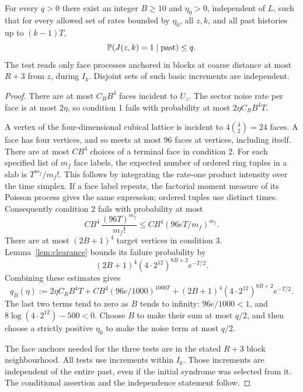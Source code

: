 \begin{lemma}\label{lem:bad-prob}
For every \(q>0\) there exist an integer \(B\ge10\) and
\(\eta_0>0\), independent of \(L\), such that for every allowed set of
rates bounded by \(\eta_0\), all \(z,k\), and all past histories up to
\((k-1)T\),
\[
 \mathbb P(J(z,k)=1\mid\text{past})\le q.
\]
The test reads only face processes anchored in blocks at coarse
distance at most \(R+3\) from \(z\), during \(I_k\).
Disjoint sets of such basic increments are independent.
\end{lemma}
\begin{proof}
There are at most \(C_RB^4\) faces incident to \(U_z\). The sector
noise rate per face is at most \(2\eta\), so condition 1 fails with
probability at most \(2\eta C_RB^4T\).

A vertex of the four-dimensional cubical lattice is incident to
\(4\binom42=24\) faces. A face has four vertices, and so meets at
most 96 faces at vertices, including itself. There are at most
\(CB^4\) choices of a terminal face in condition 2. For each specified
list of \(m_f\) face labels, the expected number of ordered ring
tuples in a slab is \(T^{m_f}/m_f!\). This follows by integrating
the rate-one product intensity over the time simplex. If a face
label repeats, the factorial moment measure of its Poisson process
gives the same expression; ordered tuples use distinct times.
Consequently condition 2 fails with probability at most
\[
 CB^4\,\frac{(96T)^{m_f}}{m_f!}
 \le CB^4(96eT/m_f)^{m_f}.
\]
There are at most \((2B+1)^4\) target vertices in condition 3.
Lemma~\ref{lem:clearance} bounds its failure probability by
\[
 (2B+1)^4(4\cdot2^{12})^{8B+2}e^{-T/2}.
\]
Combining these estimates gives
\begin{equation}\label{eq:bad-cost}
 q_B(\eta):=2\eta C_RB^4T+
 CB^4(96e/1000)^{1000T}
 +(2B+1)^4(4\cdot2^{12})^{8B+2}e^{-T/2}.
\end{equation}
The last two terms tend to zero as \(B\) tends to infinity:
\(96e/1000<1\), and
\(8\log(4\cdot2^{12})-500<0\).
Choose \(B\) to make their sum at most \(q/2\), and then choose a
strictly positive \(\eta_0\) to make the noise term at most \(q/2\).

The face anchors needed for the three tests are in the stated
\(R+3\) block neighbourhood. All tests use increments within \(I_k\).
Those increments are independent of the entire past, even if the
initial syndrome was selected from it. The conditional assertion and
the independence statement follow.
\end{proof}

